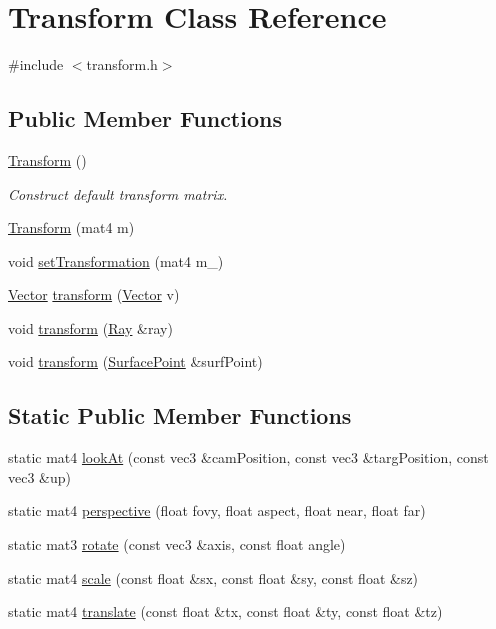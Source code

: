 \hypertarget{class_transform}{}\section{Transform Class Reference}
\label{class_transform}


{\ttfamily \#include $<$transform.\+h$>$}

\subsection*{Public Member Functions}
\begin{DoxyCompactItemize}
\item 
\mbox{\label{class_transform_aa08ca4266efabc768973cdeea51945ab}} 
\mbox{\hyperlink{class_transform_aa08ca4266efabc768973cdeea51945ab}{Transform}} ()
\begin{DoxyCompactList}\small\item\em Construct default transform matrix. \end{DoxyCompactList}\item 
\mbox{\hyperlink{class_transform_a9e66877ba4b108deb475d91b3e484b19}{Transform}} (mat4 m)
\item 
void \mbox{\hyperlink{class_transform_a527516549fad2a69271d82935e42e409}{set\+Transformation}} (mat4 m\+\_\+)
\item 
\mbox{\hyperlink{struct_vector}{Vector}} \mbox{\hyperlink{class_transform_a0326d611d8d74b4a43f0b6aaf1b87d67}{transform}} (\mbox{\hyperlink{struct_vector}{Vector}} v)
\item 
void \mbox{\hyperlink{class_transform_a9e08226abcc24477177fe1eeafaa43df}{transform}} (\mbox{\hyperlink{class_ray}{Ray}} \&ray)
\item 
void \mbox{\hyperlink{class_transform_afd54e58d092b30f7613f86c68a43ea9a}{transform}} (\mbox{\hyperlink{class_surface_point}{Surface\+Point}} \&surf\+Point)
\end{DoxyCompactItemize}
\subsection*{Static Public Member Functions}
\begin{DoxyCompactItemize}
\item 
static mat4 \mbox{\hyperlink{class_transform_a846e6b2bec58a1110d4e5296b1caa1f4}{look\+At}} (const vec3 \&cam\+Position, const vec3 \&targ\+Position, const vec3 \&up)
\item 
static mat4 \mbox{\hyperlink{class_transform_a2045e6a0d6071568fa8a2d3819a52dc7}{perspective}} (float fovy, float aspect, float near, float far)
\item 
static mat3 \mbox{\hyperlink{class_transform_a41cee512b56644e2bf87d82a26adbe01}{rotate}} (const vec3 \&axis, const float angle)
\item 
static mat4 \mbox{\hyperlink{class_transform_a8c96f4dcc6aee87b1a2b66b9fbdbfc7c}{scale}} (const float \&sx, const float \&sy, const float \&sz)
\item 
static mat4 \mbox{\hyperlink{class_transform_aee43231752c8d0f5133b0374007252a2}{translate}} (const float \&tx, const float \&ty, const float \&tz)
\end{DoxyCompactItemize}

